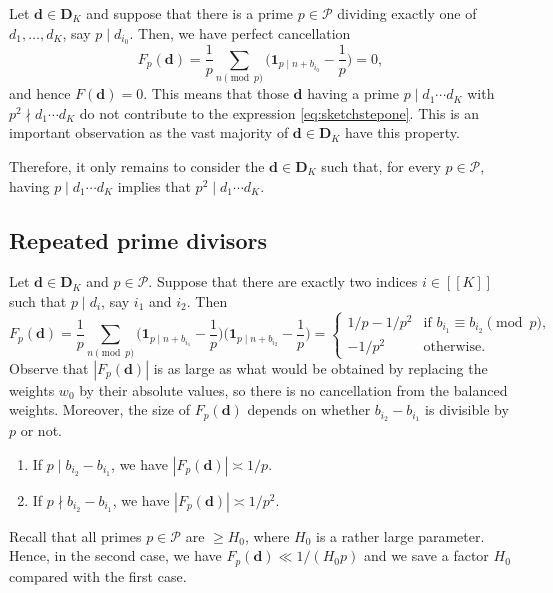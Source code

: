 \documentclass[11pt]{amsart}
\theoremstyle{definition}
\renewcommand{\geq}{\geqslant}
\newcommand{\sinterval}[1]{[\![#1]\!] }
\newcommand{\abs}[1]{\left|#1\right|}
\newcommand{\ind}[1]{\mathbf{1}_{#1}}
\newcommand{\primes}{\mathcal{P}}
\renewcommand{\d}{\boldsymbol{d}}
\newcommand{\sommespart}{b}
\newcommand{\fancyD}{\mathbf{D}}
\newcommand{\Dsf}{\fancyD_{\!\repK}}
\newcommand{\repK}{K}
\newcommand{\newK}{\sinterval{K}}
\begin{document}
Let $\d \in \Dsf$ and suppose that there is a prime $p\in \primes$ dividing exactly one of $d_1, \ldots, d_{\repK}$, say $p\mid d_{i_0}$. Then, we have perfect cancellation
\begin{equation*}
	F_p(\d) = \frac{1}{p}  \sum_{n \!\!\!\!\!\pmod{p}} \bigg(\ind{p\mid n+\sommespart_{i_0}} - \frac{1}{p} \bigg) = 0,
\end{equation*}
and hence $F(\d) = 0$. This means that those $\d$ having a prime $p\mid d_1\cdots d_{\repK}$ with $p^2\nmid d_1\cdots d_{\repK}$ do not contribute to the expression \cref{eq:sketchstepone}. This is an important observation as the vast majority of $\d \in \Dsf$ have this property. 

Therefore, it only remains to consider the $\d\in \Dsf$ such that, for every $p\in \primes$, having $p\mid d_1\cdots d_{\repK}$ implies that $p^2\mid d_1\cdots d_{\repK}$. 

\subsection{Repeated prime divisors}
\label{sec:heuristicrepeated}
Let $\d\in \Dsf$ and $p\in \primes$. Suppose that there are exactly two indices $i\in \newK$ such that $p\mid d_{i}$, say $i_1$ and $i_2$. Then
\begin{equation*}
	F_{p}(\d) = \frac{1}{p}  \sum_{n \!\!\!\!\!\pmod{p}} \bigg(\ind{p\mid n+\sommespart_{i_1}} - \frac{1}{p} \bigg) \bigg(\ind{p\mid n+\sommespart_{i_2}} - \frac{1}{p} \bigg) 
	= \begin{cases} 1/p - 1/p^2  &\text{if } \sommespart_{i_1} \equiv \sommespart_{i_2} \pmod p,\\
	-1/p^{2} &\text{otherwise.}
	\end{cases} 
\end{equation*}
Observe that $\abs{F_p(\d)}$ is as large as what would be obtained by replacing the weights $w_0$ by their absolute values, so there is no cancellation from the balanced weights. Moreover, the size of $F_p(\d)$ depends on whether $\sommespart_{i_2} - \sommespart_{i_1}$ is divisible by $p$ or not.
\begin{enumerate}
	\item \label{item:caselarge} If $p\mid \sommespart_{i_2} - \sommespart_{i_1}$, we have $\abs{F_p(\d)} \asymp 1/p$. 
	\item \label{item:casesmall} If $p\nmid  \sommespart_{i_2} - \sommespart_{i_1}$, we have $\abs{F_p(\d)}  \asymp 1/p^2$. 
\end{enumerate}
Recall that all primes $p\in \primes$ are $\geq H_0$, where $H_0$ is a rather large parameter. Hence, in the second case, we have $F_p(\d) \ll 1/(H_0p)$ and we save a factor $H_0$ compared with the first case.
\end{document}
